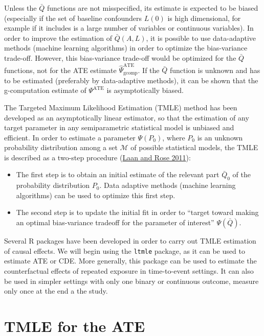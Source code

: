 \documentclass[
]{book}
\providecommand{\tightlist}{%
  \setlength{\itemsep}{0pt}\setlength{\parskip}{0pt}}
\begin{document}
Unless the \(\bar{Q}\) functions are not misspecified, its estimate is expected to be biased (especially if the set of baseline confounders \(L(0)\) is high dimensional, for example if it includes is a large number of variables or continuous variables). In order to improve the estimation of \(\bar{Q}(A,L)\), it is possible to use data-adaptive methods (machine learning algorithms) in order to optimize the bias-variance trade-off. However, this bias-variance trade-off would be optimized for the \(\bar{Q}\) functions, not for the ATE estimate \(\hat{\Psi}^\text{ATE}_\text{gcomp}\). If the \(\bar{Q}\) function is unknown and has to be estimated (preferably by data-adaptive methods), it can be shown that the g-computation estimate of \(\Psi^\text{ATE}\) is asymptotically biased.

The Targeted Maximum Likelihood Estimation (TMLE) method has been developed as an asymptotically linear estimator, so that the estimation of any target parameter in any semiparametric statistical model is unbiased and efficient. In order to estimate a parameter \(\Psi(P_0)\), where \(P_0\) is an unknown probability distribution among a set \(\mathcal{M}\) of possible statistical models, the TMLE is described as a two-step procedure (\protect\hyperlink{ref-vanderlaan_book2011}{Laan and Rose 2011}):

\begin{itemize}
\tightlist
\item
  The first step is to obtain an initial estimate of the relevant part \(\bar{Q}_0\) of the probability distribution \(P_0\). Data adaptive methods (machine learning algorithms) can be used to optimize this first step.
\item
  The second step is to update the initial fit in order to ``target toward making an optimal bias-variance tradeoff for the parameter of interest'' \(\Psi(\bar{Q})\).
\end{itemize}

Several R packages have been developed in order to carry out TMLE estimation of causal effects. We will begin using the \texttt{ltmle} package, as it can be used to estimate ATE or CDE. More generally, this package can be used to estimate the counterfactual effects of repeated exposure in time-to-event settings. It can also be used in simpler settings with only one binary or continuous outcome, measure only once at the end a the study.

\hypertarget{tmle-for-the-ate}{%
\section{TMLE for the ATE}\label{tmle-for-the-ate}}
\end{document}
